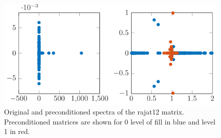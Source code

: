 \begin{figure}
\centering
\includegraphics[scale=1]{../src/figure/spectraRajat12.pdf}
%
\caption{Original and preconditioned spectra of the rajat12 matrix. Preconditioned matrices are shown for 0 level of fill in blue and level 1 in  red.}
\label{fig:rajatSpectra}
\end{figure} 
 
 
 
